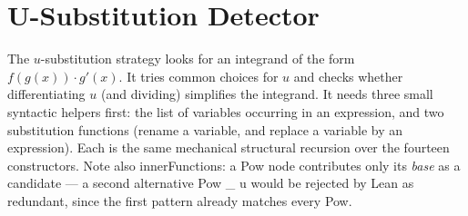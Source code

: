 \documentclass[12pt, openany]{book}
\theoremstyle{plain}
\theoremstyle{definition}
\theoremstyle{remark}
\newcommand{\li}[1]{{\ttfamily\small\color{tealaccent}#1}}
\begin{document}
\section{U-Substitution Detector}

The $u$-substitution strategy looks for an integrand of the form $f(g(x))\cdot g'(x)$.
It tries common choices for $u$ and checks whether differentiating $u$ (and dividing)
simplifies the integrand.  It needs three small syntactic helpers first: the list of
variables occurring in an expression, and two substitution functions (rename a
variable, and replace a variable by an expression).  Each is the same mechanical
structural recursion over the fourteen constructors.
Note also \li{innerFunctions}: a \li{Pow} node contributes only its \emph{base} as a
candidate --- a second alternative \li{Pow \_ u} would be rejected by Lean as
redundant, since the first pattern already matches every \li{Pow}.
\end{document}
